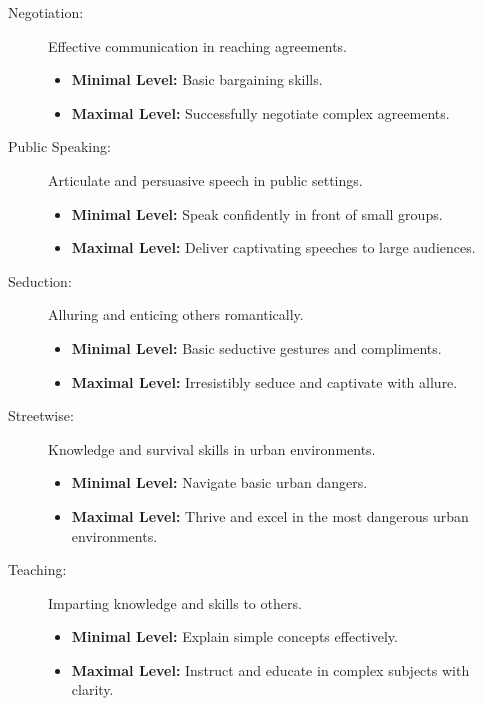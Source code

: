 \documentclass[12pt]{book}  %
\begin{document}
\begin{description}
    \item[Negotiation:] Effective communication in reaching agreements.
        \begin{itemize}
            \item \textbf{Minimal Level:} Basic bargaining skills.
            \item \textbf{Maximal Level:} Successfully negotiate complex agreements.
        \end{itemize}

    \item[Public Speaking:] Articulate and persuasive speech in public settings.
        \begin{itemize}
            \item \textbf{Minimal Level:} Speak confidently in front of small groups.
            \item \textbf{Maximal Level:} Deliver captivating speeches to large audiences.
        \end{itemize}

    \item[Seduction:] Alluring and enticing others romantically.
        \begin{itemize}
            \item \textbf{Minimal Level:} Basic seductive gestures and compliments.
            \item \textbf{Maximal Level:} Irresistibly seduce and captivate with allure.
        \end{itemize}

    \item[Streetwise:] Knowledge and survival skills in urban environments.
        \begin{itemize}
            \item \textbf{Minimal Level:} Navigate basic urban dangers.
            \item \textbf{Maximal Level:} Thrive and excel in the most dangerous urban environments.
        \end{itemize}

    \item[Teaching:] Imparting knowledge and skills to others.
        \begin{itemize}
            \item \textbf{Minimal Level:} Explain simple concepts effectively.
            \item \textbf{Maximal Level:} Instruct and educate in complex subjects with clarity.
        \end{itemize}


\end{description}
\end{document}
